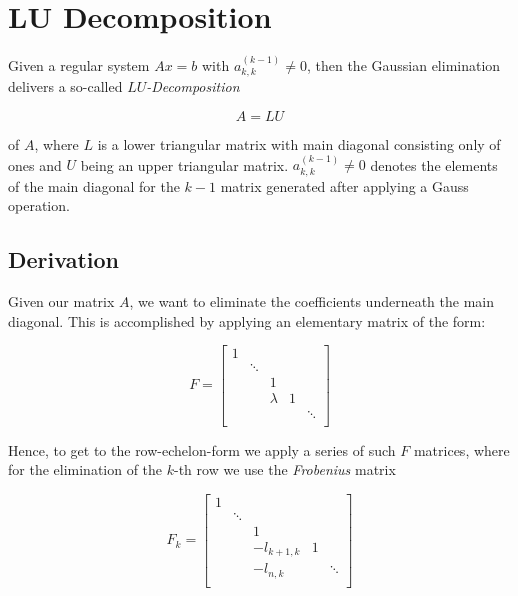 \section{LU Decomposition}

Given a regular system \(Ax = b\) with \(a_{k,k}^{(k - 1)} \ne 0\), then the Gaussian elimination delivers a so-called 
\emph{\(LU\)-Decomposition} 

\[
    A = LU
\]

of \(A\), where \(L\) is a lower triangular matrix with main diagonal consisting only of ones and 
\(U\) being an upper triangular matrix. \(a_{k,k}^{(k - 1)} \ne 0\) denotes the elements of the main diagonal for the 
\(k - 1\) matrix generated after applying a Gauss operation.

\subsection{Derivation}

Given our matrix \(A\), we want to eliminate the coefficients underneath the main diagonal. This is accomplished by applying an elementary matrix of the form: 

\[
    F = 
    \begin{bmatrix}
        1 &        &         &   &        \\
          & \ddots &         &   &        \\
          &        & 1       &   &        \\
          &        & \lambda & 1 &        \\
          &        &         &   & \ddots \\
    \end{bmatrix}
\]

Hence, to get to the row-echelon-form we apply a series of such \(F\) matrices, where for the 
elimination of the \(k\)-th row we use the \emph{Frobenius} matrix 

\[
    F_k = 
    \begin{bmatrix}
        1 &        &         &   &        \\
          & \ddots &         &   &        \\
          &        & 1       &   &        \\
          &        & -l_{k +1, k} & 1 &        \\
          &        &  -l_{n,k}       &   & \ddots \\
    \end{bmatrix}
\]

